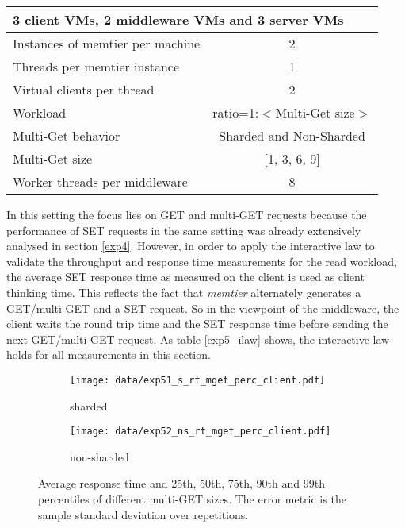 \documentclass[report.tex]{subfiles}
\begin{document}
\begin{center}
	\scriptsize{
		\begin{tabular}{|l|c|}
			\multicolumn{2}{l}{3 client VMs, 2 middleware VMs and 3 server VMs}\\
			\hline Instances of memtier per machine & 2                       \\ 
			\hline Threads per memtier instance     & 1                       \\
			\hline Virtual clients per thread       & 2     		           \\ 
			\hline Workload                         & ratio=1:$<$Multi-Get size$>$         \\
			\hline Multi-Get behavior               & Sharded and Non-Sharded  \\
			\hline Multi-Get size                   & [1, 3, 6, 9]            \\
			\hline Worker threads per middleware    & 8 \\
			\hline 
		\end{tabular}
	} 
\end{center}

In this setting the focus lies on GET and multi-GET requests because the performance of SET requests in the same setting was already extensively analysed in section \ref{exp4}.
However, in order to apply the interactive law to validate the throughput and response time measurements for the read workload, the average SET response time as measured on the client is used as client thinking time. This reflects the fact that \emph{memtier} alternately generates a GET/multi-GET and a SET request. So in the viewpoint of the middleware, the client waits the round trip time and the SET response time before sending the next GET/multi-GET request. As table \ref{exp5_ilaw} shows, the interactive law holds for all measurements in this section.

\begin{figure}[H]
	\begin{subfigure}[b]{.49\linewidth}
		\centering
		\texttt{[image: data/exp51\_s\_rt\_mget\_perc\_client.pdf]}
		\caption{sharded}\label{exp51_s_rt_mget_perc}
	\end{subfigure}\hfill
	\begin{subfigure}[b]{.49\linewidth}
		\centering
		\texttt{[image: data/exp52\_ns\_rt\_mget\_perc\_client.pdf]}
		\caption{non-sharded}\label{exp52_ns_rt_mget_perc}
	\end{subfigure}%
	\caption{Average response time and 25th, 50th, 75th, 90th and 99th percentiles of different multi-GET sizes. The error metric is the sample standard deviation over repetitions.}\label{exp5_rt_mget_perc}
\end{figure}
\end{document}
